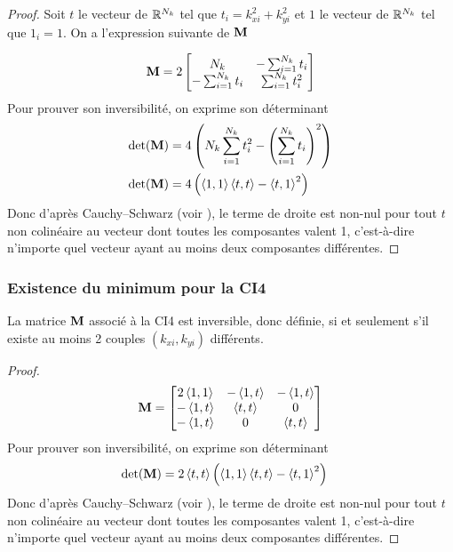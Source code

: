       \begin{proof}
        Soit \(t\) le vecteur de \(\mathbb R^{N_{k}}\) tel que \(t_i = k_{xi}^2 + k_{yi}^2\) et \(1\) le vecteur de \(\mathbb R^{N_{k}}\) tel que \(1_i = 1\). On a l'expression suivante de \({\mathbf{M}}\)

        \begin{equation*}
          {\mathbf{M}} = 2\begin{bmatrix}
          N_{k} & -\sum_{i=1}^{N_{k}} t_i
          \\
          -\sum_{i=1}^{N_{k}} t_i & \sum_{i=1}^{N_{k}} t_i^2
          \end{bmatrix}
        \end{equation*}
        Pour prouver son inversibilité, on exprime son déterminant 
        \begin{align*}
          \det( {\mathbf{M}}) &= 4\left(N_{k}\sum_{i=1}^{N_{k}} t_i^2 - \left( \sum_{i=1}^{N_{k}} t_i\right)^2\right)
          \\
          \det( {\mathbf{M}}) &= 4\left( \left<{1},{1}\right>\left<{t},{t}\right> - \left<{t},{1}\right>^2\right)
        \end{align*}
        Donc d'après Cauchy–Schwarz (voir \cite[\href{https://dlmf.nist.gov/1.7\#E1}{eq.~1.7.1}]{dlmf_nist_2019}), le terme de droite est non-nul pour tout \(t\) non colinéaire au vecteur dont toutes les composantes valent 1, c'est-à-dire n'importe quel vecteur ayant au moins deux composantes différentes.
      \end{proof}

    \subsubsection{Existence du minimum pour la CI4}

      \begin{prop}
        La matrice \({\mathbf{M}}\) associé à la CI4 est inversible, donc définie, si et seulement s'il existe au moins 2 couples \((k_{xi},k_{yi})\) différents.
      \end{prop}

      \begin{proof}
        \begin{equation*}
          {\mathbf{M}} = \begin{bmatrix}
          2\left<{1},{1}\right> & -\left<{1},{t}\right> & -\left<{1},{t}\right>
          \\
          -\left<{1},{t}\right> & \left<{t},{t}\right>  & 0
          \\
          -\left<{1},{t}\right> & 0          & \left<{t},{t}\right>
          \end{bmatrix}
        \end{equation*}
        Pour prouver son inversibilité, on exprime son déterminant 
        \begin{align*}
          \det( {\mathbf{M}}) &= 2\left<{t},{t}\right>\left( \left<{1},{1}\right>\left<{t},{t}\right> - \left<{t},{1}\right>^2\right)
        \end{align*}
        Donc d'après Cauchy–Schwarz (voir \cite[\href{https://dlmf.nist.gov/1.7\#E1}{eq.~1.7.1}]{dlmf_nist_2019}), le terme de droite est non-nul pour tout \(t\) non colinéaire au vecteur dont toutes les composantes valent 1, c'est-à-dire n'importe quel vecteur ayant au moins deux composantes différentes.
      \end{proof}

